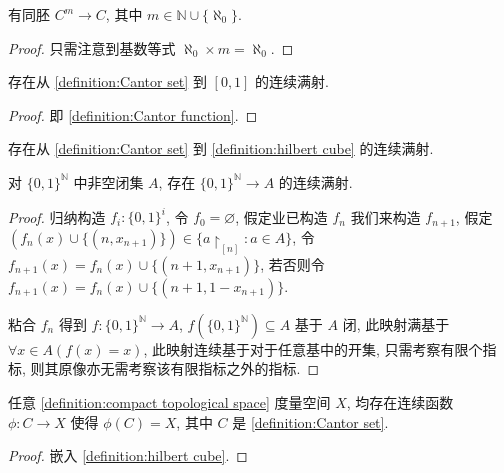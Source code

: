 \begin{lemma}
    有同胚 \(C^{m} \to C\), 其中 \(m \in \mathbb{N} \cup \{\aleph_0\}\).

    \begin{proof}
        只需注意到基数等式 \(\aleph_0 \times m = \aleph_0\).
    \end{proof}
\end{lemma}

\begin{lemma}
    存在从 \ref{definition:Cantor set} 到 \([0,1]\) 的连续满射.

    \begin{proof}
        即 \ref{definition:Cantor function}.
    \end{proof}
\end{lemma}

\begin{corollary}
    存在从 \ref{definition:Cantor set} 到 \ref{definition:hilbert cube} 的连续满射.
\end{corollary}

\begin{lemma}
    对 \({\{0,1\}}^{\mathbb{N}}\) 中非空闭集 \(A\), 存在 \({\{0,1\}}^{\mathbb{N}} \to A\) 的连续满射.

    \begin{proof}
        归纳构造 \(f_i : {\{0,1\}}^{i}\), 令 \(f_0 = \varnothing\), 假定业已构造 \(f_n\) 我们来构造 \(f_{n+1}\), 
        假定 \((f_n(x) \cup \{(n,x_{n+1})\}) \in \{a \upharpoonright_{[n]}:a \in A\}\),
        令 \(f_{n+1}(x) = f_n(x) \cup \{(n+1,x_{n+1})\}\), 若否则令 \(f_{n+1}(x) = f_n(x) \cup \{(n+1,1-x_{n+1})\}\).

        粘合 \(f_n\) 得到 \(f : {\{0,1\}}^{\mathbb{N}} \to A\), \(f({\{0,1\}}^{\mathbb{N}}) \subseteq A\) 基于 \(A\) 闭, 此映射满基于 \(\forall x \in A (f(x) = x)\),
        此映射连续基于对于任意基中的开集, 只需考察有限个指标, 则其原像亦无需考察该有限指标之外的指标.
    \end{proof}
\end{lemma}

\begin{theorem}
    任意 \ref{definition:compact topological space} 度量空间 \(X\), 均存在连续函数 \(\phi:C \to X\) 使得 \(\phi(C) = X\),
    其中 \(C\) 是 \ref{definition:Cantor set}.

    \begin{proof}
        嵌入 \ref{definition:hilbert cube}.
    \end{proof}
\end{theorem}

